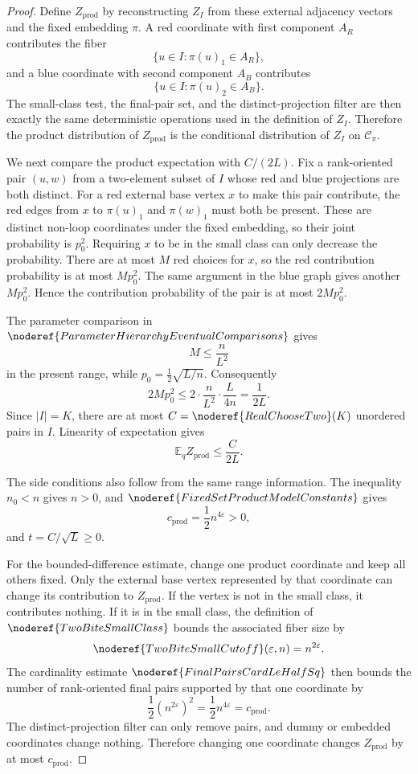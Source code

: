 \begin{proof}
Define \(Z_{\mathrm{prod}}\) by reconstructing \(Z_I\) from these external
adjacency vectors and the fixed embedding \(\pi\).  A red coordinate with
first component \(A_R\) contributes the fiber
\[
\{u\in I:\pi(u)_1\in A_R\},
\]
and a blue coordinate with second component \(A_B\) contributes
\[
\{u\in I:\pi(u)_2\in A_B\}.
\]
The small-class test, the final-pair set, and the distinct-projection filter
are then exactly the same deterministic operations used in the definition of
\(Z_I\).  Therefore the product distribution of \(Z_{\mathrm{prod}}\) is the
conditional distribution of \(Z_I\) on \(\mathcal C_\pi\).

We next compare the product expectation with \(C/(2L)\).  Fix a rank-oriented
pair \((u,w)\) from a two-element subset of \(I\) whose red and blue
projections are both distinct.
For a red external base vertex \(x\) to make this pair contribute, the red
edges from \(x\) to \(\pi(u)_1\) and \(\pi(w)_1\) must both be present.  These
are distinct non-loop coordinates under the fixed embedding, so their joint
probability is \(p_0^2\).  Requiring \(x\) to be in the small class can only
decrease the probability.  There are at most \(M\) red choices for \(x\), so
the red contribution probability is at most \(Mp_0^2\).  The same argument in
the blue graph gives another \(Mp_0^2\).  Hence the contribution probability
of the pair is at most \(2Mp_0^2\).

The parameter comparison in
\(\noderef{ParameterHierarchyEventualComparisons}\) gives
\[
M\le \frac{n}{L^2}
\]
in the present range, while \(p_0=\frac12\sqrt{L/n}\).  Consequently
\[
2Mp_0^2\le 2\cdot\frac{n}{L^2}\cdot\frac{L}{4n}
=\frac1{2L}.
\]
Since \(|I|=K\), there are at most
\(C=\noderef{RealChooseTwo}(K)\) unordered pairs in \(I\).  Linearity of
expectation gives
\[
\mathbb E_q Z_{\mathrm{prod}}\le \frac{C}{2L}.
\]

The side conditions also follow from the same range information.  The
inequality \(n_0<n\) gives \(n>0\), and
\(\noderef{FixedSetProductModelConstants}\) gives
\[
c_{\mathrm{prod}}=\frac12 n^{4\varepsilon}>0,
\]
and \(t=C/\sqrt L\ge0\).

For the bounded-difference estimate, change one product coordinate and keep
all others fixed.  Only the external base vertex represented by that coordinate
can change its contribution to \(Z_{\mathrm{prod}}\).  If the vertex is not in
the small class, it contributes nothing.  If it is in the small class, the
definition of \(\noderef{TwoBiteSmallClass}\) bounds the associated fiber size
by
\[
\noderef{TwoBiteSmallCutoff}(\varepsilon,n)=n^{2\varepsilon}.
\]
The cardinality estimate \(\noderef{FinalPairsCardLeHalfSq}\) then bounds the
number of rank-oriented final pairs supported by that one coordinate by
\[
\frac12\left(n^{2\varepsilon}\right)^2=\frac12n^{4\varepsilon}
=c_{\mathrm{prod}}.
\]
The distinct-projection filter can only remove pairs, and dummy or embedded
coordinates change nothing.  Therefore changing one coordinate changes
\(Z_{\mathrm{prod}}\) by at most \(c_{\mathrm{prod}}\).


\end{proof}
